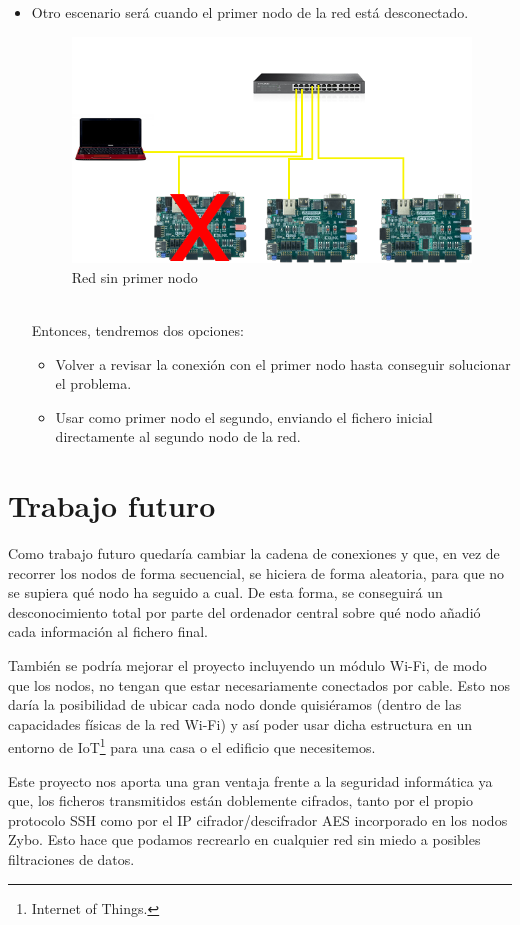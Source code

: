 \begin{itemize}
\begin{figure}[h]
	\end{figure}
	\item Otro escenario será cuando el primer nodo de la red está desconectado.
	\begin{figure}[h]
		\centering
		\includegraphics[scale=0.5]{Epilogo/RedSinNodo1.png}
		\caption{Red sin primer nodo}
		\label{Red sin primer nodo}
	\end{figure}\\
	Entonces, tendremos dos opciones:
	\begin{itemize}
		\item Volver a revisar la conexión con el primer nodo hasta conseguir solucionar el problema.
		\item Usar como primer nodo el segundo, enviando el fichero inicial directamente al segundo nodo de la red.
	\end{itemize}
\end{itemize}

\section{Trabajo futuro}
Como trabajo futuro quedaría cambiar la cadena de conexiones y que, en vez de recorrer los nodos de forma secuencial, se hiciera de forma aleatoria, para que no se supiera qué nodo ha seguido a cual. De esta forma, se conseguirá un desconocimiento total por parte del ordenador central sobre qué nodo añadió cada información al fichero final.

También se podría mejorar el proyecto incluyendo un módulo Wi-Fi, de modo que los nodos, no tengan que estar necesariamente conectados por cable. Esto nos daría la posibilidad de ubicar cada nodo donde quisiéramos (dentro de las capacidades físicas de la red Wi-Fi) y así poder usar dicha estructura en un entorno de IoT\footnote{Internet of Things.} para una casa o el edificio que necesitemos.

Este proyecto nos aporta una gran ventaja frente a la seguridad informática ya que, los ficheros transmitidos están doblemente cifrados, tanto por el propio protocolo SSH como por el IP cifrador/descifrador AES incorporado en los nodos Zybo. Esto hace que podamos recrearlo en cualquier red sin miedo a posibles filtraciones de datos.